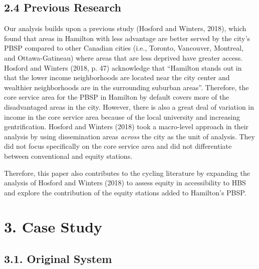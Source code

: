 \documentclass[]{elsarticle} %
\begin{document}
\hypertarget{previous-research}{%
\subsection{2.4 Previous Research}\label{previous-research}}

Our analysis builds upon a previous study (Hosford and Winters, 2018),
which found that areas in Hamilton with less advantage are better served
by the city's PBSP compared to other Canadian cities (i.e., Toronto,
Vancouver, Montreal, and Ottawa-Gatineau) where areas that are less
deprived have greater access. Hosford and Winters (2018, p. 47)
acknowledge that ``Hamilton stands out in that the lower income
neighborhoods are located near the city center and wealthier
neighborhoods are in the surrounding suburban areas''. Therefore, the
core service area for the PBSP in Hamilton by default covers more of the
disadvantaged areas in the city. However, there is also a great deal of
variation in income in the core service area because of the local
university and increasing gentrification. Hosford and Winters (2018)
took a macro-level approach in their analysis by using dissemination
areas \emph{across} the city as the unit of analysis. They did not focus
specifically on the core service area and did not differentiate between
conventional and equity stations.

Therefore, this paper also contributes to the cycling literature by
expanding the analysis of Hosford and Winters (2018) to assess equity in
accessibility to HBS and explore the contribution of the equity stations
added to Hamilton's PBSP.

\hypertarget{sec:study}{%
\section{3. Case Study}\label{sec:study}}

\hypertarget{original-system}{%
\subsection{3.1. Original System}\label{original-system}}
\end{document}

